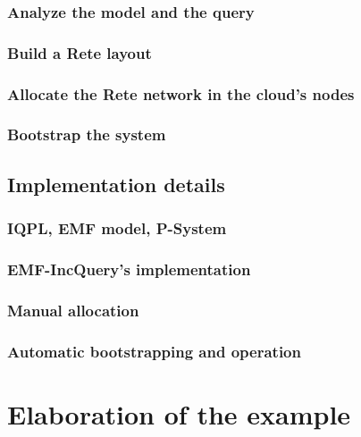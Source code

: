 \subsubsection{Analyze the model and the query}

\subsubsection{Build a Rete layout}

\subsubsection{Allocate the Rete network in the cloud's nodes}

\subsubsection{Bootstrap the system}

\subsection{Implementation details}

\subsubsection{IQPL, EMF model, P-System}

\subsubsection{EMF-IncQuery's implementation}

\subsubsection{Manual allocation}

\subsubsection{Automatic bootstrapping and operation}




\section{Elaboration of the example}

